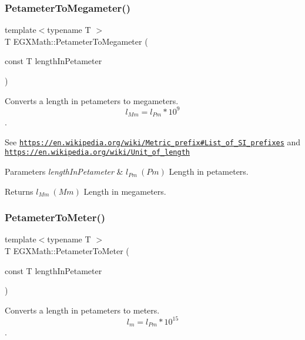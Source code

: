\subsubsection{\texorpdfstring{Petameter\+To\+Megameter()}{PetameterToMegameter()}}
{\footnotesize\ttfamily template$<$typename T $>$ \\
T E\+G\+X\+Math\+::\+Petameter\+To\+Megameter (\begin{DoxyParamCaption}\item[{const T}]{length\+In\+Petameter }\end{DoxyParamCaption})}



Converts a length in petameters to megameters. \[ l_{Mm}=l_{Pm} * 10^{9} \]. 

See \href{https://en.wikipedia.org/wiki/Metric_prefix#List_of_SI_prefixes}{\tt https\+://en.\+wikipedia.\+org/wiki/\+Metric\+\_\+prefix\#\+List\+\_\+of\+\_\+\+S\+I\+\_\+prefixes} and \href{https://en.wikipedia.org/wiki/Unit_of_length}{\tt https\+://en.\+wikipedia.\+org/wiki/\+Unit\+\_\+of\+\_\+length} 
\begin{DoxyParams}{Parameters}
{\em length\+In\+Petameter} & $ l_{Pm}\ (Pm)$ Length in petameters. \\
\hline
\end{DoxyParams}
\begin{DoxyReturn}{Returns}
$ l_{Mm}\ (Mm)$ Length in megameters. 
\end{DoxyReturn}
\mbox{\label{group___e_g_x_math-_conversions-_length_conversions-_s_i-_petameter-_s_i_ga604a637d8bd107a2eaa162757b2e813b}} 
\subsubsection{\texorpdfstring{Petameter\+To\+Meter()}{PetameterToMeter()}}
{\footnotesize\ttfamily template$<$typename T $>$ \\
T E\+G\+X\+Math\+::\+Petameter\+To\+Meter (\begin{DoxyParamCaption}\item[{const T}]{length\+In\+Petameter }\end{DoxyParamCaption})}



Converts a length in petameters to meters. \[ l_{m}=l_{Pm} * 10^{15} \]. 



